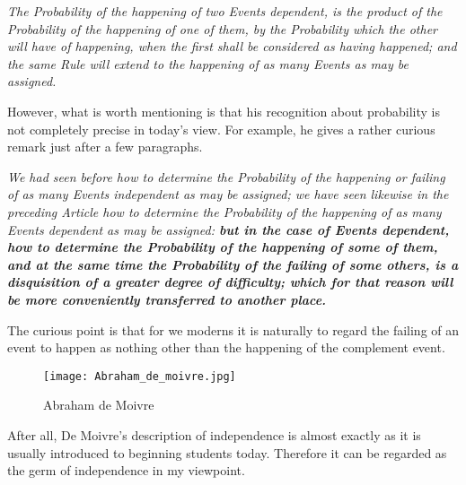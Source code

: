 \documentclass{article}
\begin{document}
\begin{tcolorbox}[colback=black!0!white,colframe=red!75!black]
\slshape
The Probability of the happening of two Events dependent, is the product of the Probability of the happening of one of them, by the Probability which the other will have of happening, when the first shall be considered as having happened; and the same Rule will extend to the happening of as many Events as may be assigned.
\end{tcolorbox}

However, what is worth mentioning is that his recognition about probability is not completely precise in today's view. For example, he gives a rather curious remark just after a few paragraphs.
\begin{tcolorbox}[colback=black!0!white,colframe=red!75!black]
\slshape
We had seen before how to determine the Probability of the happening or failing of as many Events independent as may be assigned; we have seen likewise in the preceding Article how to determine the Probability of the happening of as many Events dependent as may be assigned: \bfseries but in the case of Events dependent, how to determine the Probability of the happening of some of them, and at the same time the Probability of the failing of some others, is a disquisition of a greater degree of difficulty; which for that reason will be more conveniently transferred to another place.
\end{tcolorbox}
The curious point is that for we moderns it is naturally to regard the failing of an event to happen as nothing other than the happening of the complement event.
\begin{figure}
    \centering
    \texttt{[image: Abraham\_de\_moivre.jpg]}
    \caption{Abraham de Moivre}
    \label{fig:my_label}
\end{figure}

After all, De Moivre's description of independence is almost exactly as it is usually introduced to beginning students today. Therefore it can be regarded as the germ of independence in my viewpoint.
\end{document}

